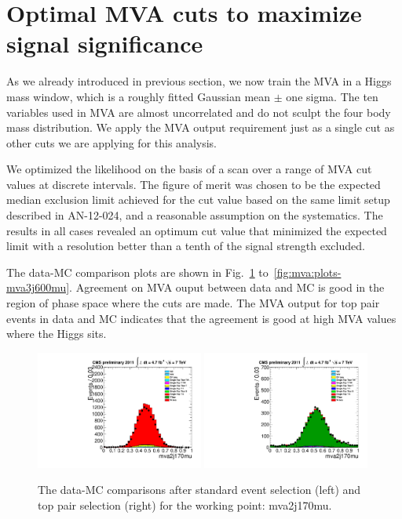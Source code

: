 \section{Optimal MVA cuts to maximize signal significance}

As we already introduced in previous section, we now train the MVA in
a Higgs mass window, which is a roughly fitted Gaussian mean
$\pm$ one sigma. The ten variables used in MVA are almost uncorrelated
and do not sculpt the four body mass distribution. We apply the MVA
output requirement just as a single cut as other cuts we are applying
for this analysis.

We optimized the likelihood on the basis of a scan over a range of MVA
cut values at discrete intervals. The figure of merit was chosen to be
the expected median exclusion limit achieved for the cut value based
on the same limit setup described in AN-12-024, and a reasonable
assumption on the systematics. The results in all cases revealed an
optimum cut value that minimized the expected limit with a resolution
better than a tenth of the signal strength excluded.

The data-MC comparison plots are shown in
Fig.~\ref{fig:mva:plots-mva2j170mu} to~\ref{fig:mva:plots-mva3j600mu}.
Agreement on MVA ouput between data and MC is good in the region of
phase space where the cuts are made. The MVA output for top pair
events in data and MC indicates that the agreement is good at high MVA
values where the Higgs sits.


\clearpage
\begin{figure}[!t]
  \centering
  \includegraphics[width=0.49\textwidth]{figs/cl-mva2j170mu-normal.pdf}
  \includegraphics[width=0.49\textwidth]{figs/cl-mva2j170mu-inTTbar.pdf}
  \caption{\label{fig:mva:plots-mva2j170mu} The data-MC comparisons
    after standard event selection (left) and top pair
    selection (right) for the working point: mva2j170mu.}
\end{figure}

